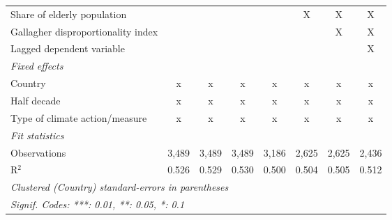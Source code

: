 \begin{tabular}{lccccccc}
   Share of elderly population                                        &                &               &                &               & X             & X             & X\\  
   Gallagher disproportionality index                                 &                &               &                &               &               & X             & X\\  
   Lagged dependent variable                                          &                &               &                &               &               &               & X\\  
   \emph{Fixed effects}\\
   Country                                                            & x              & x             & x              & x             & x             & x             & x\\  
   Half decade                                                        & x              & x             & x              & x             & x             & x             & x\\  
   Type of climate action/measure                                     & x              & x             & x              & x             & x             & x             & x\\  
   \midrule \emph{Fit statistics}\\
   Observations                                                       & 3,489          & 3,489         & 3,489          & 3,186         & 2,625         & 2,625         & 2,436\\  
   R$^2$                                                              & 0.526          & 0.529         & 0.530          & 0.500         & 0.504         & 0.505         & 0.512\\  
   \midrule
   \multicolumn{8}{l}{\emph{Clustered (Country) standard-errors in parentheses}}\\
   \multicolumn{8}{l}{\emph{Signif. Codes: ***: 0.01, **: 0.05, *: 0.1}}\\
\end{tabular}
\par\endgroup



